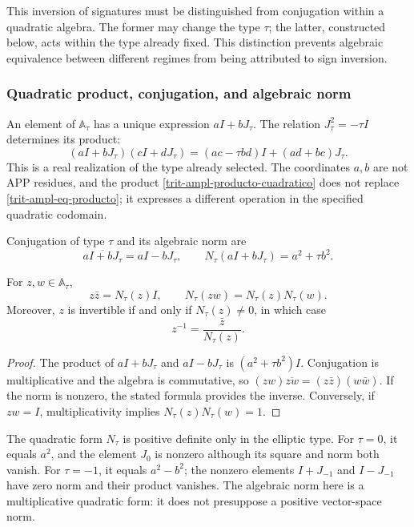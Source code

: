 This inversion of signatures must be distinguished from conjugation within a
quadratic algebra. The former may change the type \(\tau\); the latter,
constructed below, acts within the type already fixed. This
distinction prevents algebraic equivalence between different regimes from
being attributed to sign inversion.

\subsubsection{Quadratic product, conjugation, and algebraic norm}
\label{trit-ampl-norma}

An element of \(\mathbb A_\tau\) has a unique expression \(aI+bJ_\tau\).
The relation \(J_\tau^2=-\tau I\) determines its product:
\begin{equation}
 (aI+bJ_\tau)(cI+dJ_\tau)
   =(ac-\tau bd)I+(ad+bc)J_\tau.
 \label{trit-ampl-producto-cuadratico}
\end{equation}
This is a real realization of the type already selected. The coordinates
\(a,b\) are not APP residues, and the product
\eqref{trit-ampl-producto-cuadratico} does not replace
\eqref{trit-ampl-eq-producto}; it expresses a different operation in the
specified quadratic codomain.

\begin{definition}
\label{trit-ampl-def-norma}
Conjugation of type \(\tau\) and its algebraic norm are
\[
 \overline{aI+bJ_\tau}=aI-bJ_\tau,\qquad
 N_\tau(aI+bJ_\tau)=a^2+\tau b^2.
\]
\end{definition}

\begin{proposition}
\label{trit-ampl-prop-norma}
For \(z,w\in\mathbb A_\tau\),
\[
 z\bar z=N_\tau(z)I,\qquad
 N_\tau(zw)=N_\tau(z)N_\tau(w).
\]
Moreover, \(z\) is invertible if and only if \(N_\tau(z)\ne0\), in which case
\[
 z^{-1}=\frac{\bar z}{N_\tau(z)}.
\]
\end{proposition}
\begin{proof}
The product of \(aI+bJ_\tau\) and \(aI-bJ_\tau\) is
\((a^2+\tau b^2)I\). Conjugation is multiplicative and the algebra is
commutative, so
\((zw)\overline{zw}=(z\bar z)(w\bar w)\). If the norm is nonzero, the
stated formula provides the inverse. Conversely, if \(zw=I\),
multiplicativity implies \(N_\tau(z)N_\tau(w)=1\).
\end{proof}

The quadratic form \(N_\tau\) is positive definite only in the elliptic type.
For \(\tau=0\), it equals \(a^2\), and the element \(J_0\) is nonzero although its
square and norm both vanish. For \(\tau=-1\), it equals \(a^2-b^2\); the
nonzero elements \(I+J_{-1}\) and \(I-J_{-1}\) have zero norm and their
product vanishes. The algebraic norm here is a multiplicative quadratic
form: it does not presuppose a positive vector-space norm.

